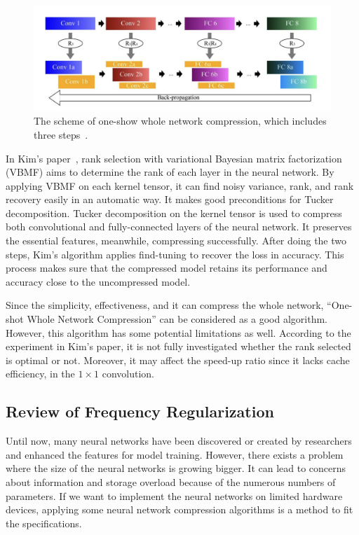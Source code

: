 \documentclass{article}
\begin{document}
\begin{figure}[!h]
	\centering
	\includegraphics[width=1\textwidth]{./figure/one-shot-steps.png}
	\caption{The scheme of one-show whole network compression, which includes three steps~\cite{kim2016compression}.}
	\label{one-shot-steps}
\end{figure}

In Kim’s paper~\cite{kim2016compression}, rank selection with variational Bayesian matrix factorization (VBMF) aims to determine the rank of each layer in the neural network. By applying VBMF on each kernel tensor, it can find noisy variance, rank, and rank recovery easily in an automatic way. It makes good preconditions for Tucker decomposition. Tucker decomposition on the kernel tensor is used to compress both convolutional and fully-connected layers of the neural network. It preserves the essential features, meanwhile, compressing successfully. After doing the two steps, Kim’s algorithm applies find-tuning to recover the loss in accuracy. This process makes sure that the compressed model retains its performance and accuracy close to the uncompressed model.

Since the simplicity, effectiveness, and it can compress the whole network, “One-shot Whole Network Compression” can be considered as a good algorithm. However, this algorithm has some potential limitations as well. According to the experiment in Kim’s paper, it is not fully investigated whether the rank selected is optimal or not. Moreover, it may affect the speed-up ratio since it lacks cache efficiency, in the $1 \times 1$ convolution.

\subsection{Review of Frequency Regularization}

Until now, many neural networks have been discovered or created by researchers and enhanced the features for model training. However, there exists a problem where the size of the neural networks is growing bigger. It can lead to concerns about information and storage overload because of the numerous numbers of parameters. If we want to implement the neural networks on limited hardware devices, applying some neural network compression algorithms is a method to fit the specifications. 
\end{document}
